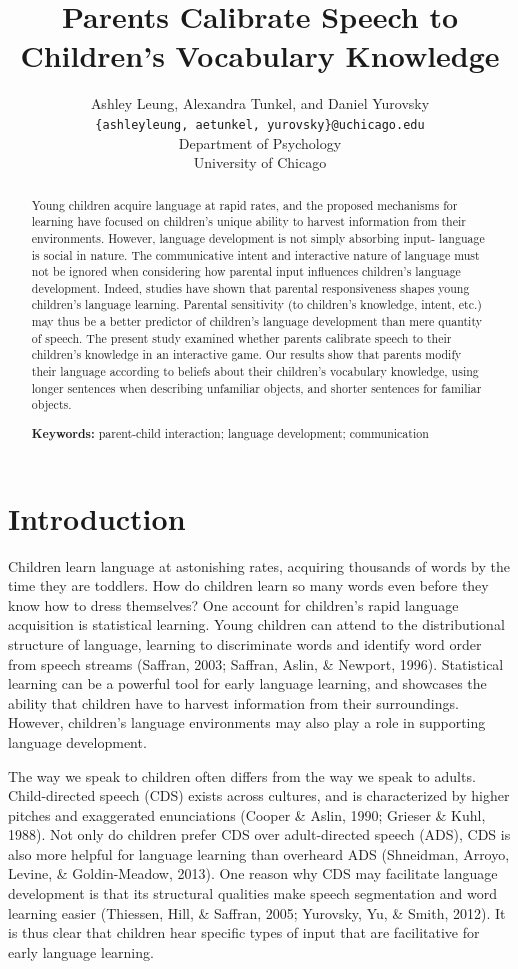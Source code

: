 \documentclass[10pt, letterpaper]{article}
\title{Parents Calibrate Speech to Children's Vocabulary Knowledge}
\author{Ashley Leung, Alexandra Tunkel, and Daniel Yurovsky \\
        \texttt{\{ashleyleung, aetunkel, yurovsky\}@uchicago.edu} \\
       Department of Psychology \\ University of Chicago}
\begin{document}
\maketitle

\begin{abstract}
Young children acquire language at rapid rates, and the proposed
mechanisms for learning have focused on children's unique ability to
harvest information from their environments. However, language
development is not simply absorbing input- language is social in nature.
The communicative intent and interactive nature of language must not be
ignored when considering how parental input influences children's
language development. Indeed, studies have shown that parental
responsiveness shapes young children's language learning. Parental
sensitivity (to children's knowledge, intent, etc.) may thus be a better
predictor of children's language development than mere quantity of
speech. The present study examined whether parents calibrate speech to
their children's knowledge in an interactive game. Our results show that
parents modify their language according to beliefs about their
children's vocabulary knowledge, using longer sentences when describing
unfamiliar objects, and shorter sentences for familiar objects.

\textbf{Keywords:}
parent-child interaction; language development; communication
\end{abstract}

\hypertarget{introduction}{%
\section{Introduction}\label{introduction}}

Children learn language at astonishing rates, acquiring thousands of
words by the time they are toddlers. How do children learn so many words
even before they know how to dress themselves? One account for
children's rapid language acquisition is statistical learning. Young
children can attend to the distributional structure of language,
learning to discriminate words and identify word order from speech
streams (Saffran, 2003; Saffran, Aslin, \& Newport, 1996). Statistical
learning can be a powerful tool for early language learning, and
showcases the ability that children have to harvest information from
their surroundings. However, children's language environments may also
play a role in supporting language development.

The way we speak to children often differs from the way we speak to
adults. Child-directed speech (CDS) exists across cultures, and is
characterized by higher pitches and exaggerated enunciations (Cooper \&
Aslin, 1990; Grieser \& Kuhl, 1988). Not only do children prefer CDS
over adult-directed speech (ADS), CDS is also more helpful for language
learning than overheard ADS (Shneidman, Arroyo, Levine, \&
Goldin-Meadow, 2013). One reason why CDS may facilitate language
development is that its structural qualities make speech segmentation
and word learning easier (Thiessen, Hill, \& Saffran, 2005; Yurovsky,
Yu, \& Smith, 2012). It is thus clear that children hear specific types
of input that are facilitative for early language learning.
\end{document}
